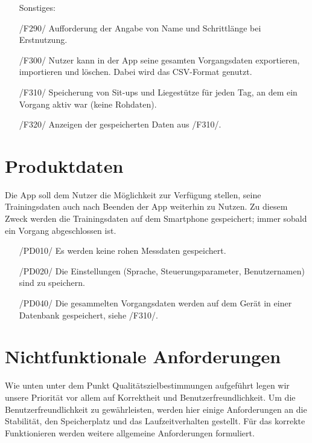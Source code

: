\documentclass[a4paper,12pt]{article}
\begin{document}
\begin{itemize}
      Sonstiges:
      \item[/F290/] Aufforderung der Angabe von Name und Schrittlänge bei Erstnutzung.
      \item[/F300/] Nutzer kann in der App seine gesamten \Gls{Vorgangsdaten} exportieren, importieren und löschen. Dabei wird das CSV-Format genutzt. 
      \item[/F310/] Speicherung von Sit-ups und Liegestütze für jeden Tag, an dem ein \Gls{Vorgang} aktiv war (keine \Gls{Rohdaten}).
      \item[/F320/] Anzeigen der gespeicherten Daten aus /F310/.
      \end{itemize}


\section{Produktdaten}
Die App soll dem Nutzer die Möglichkeit zur Verfügung stellen, seine Trainingsdaten auch nach Beenden der App weiterhin zu Nutzen. Zu diesem Zweck werden die Trainingsdaten auf dem Smartphone gespeichert; immer sobald ein Vorgang abgeschlossen ist.
\begin{itemize}
	\item[/PD010/] Es werden keine rohen Messdaten gespeichert.
	\item[/PD020/] Die Einstellungen (Sprache, \Gls{Steuerungsparameter}, Benutzernamen) sind zu speichern. 
	\item[/PD040/] Die gesammelten \Gls{Vorgangsdaten} werden auf dem Gerät in einer Datenbank gespeichert, siehe /F310/.
\end{itemize}


\section{Nichtfunktionale Anforderungen}
Wie unten unter dem Punkt Qualitätszielbestimmungen aufgeführt legen wir unsere Priorität vor allem auf Korrektheit und Benutzerfreundlichkeit. Um die Benutzerfreundlichkeit zu gewährleisten, werden hier einige Anforderungen an die Stabilität, den Speicherplatz und das Laufzeitverhalten gestellt. Für das korrekte Funktionieren werden weitere allgemeine Anforderungen formuliert.
\end{document}
